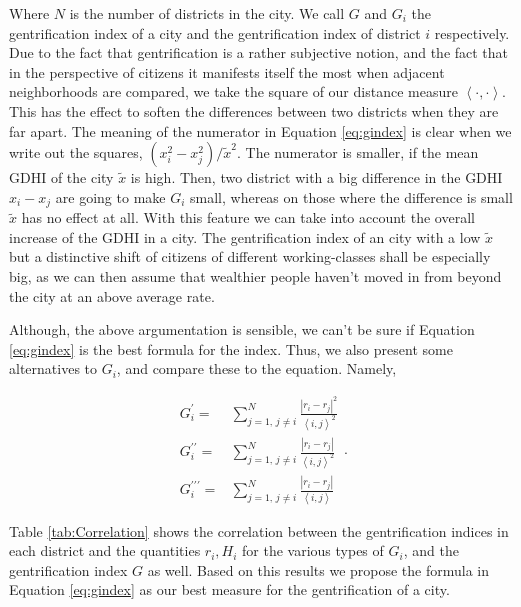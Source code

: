 \documentclass[a4paper, 10pt]{IEEEconf}      %
\begin{document}
Where $N$ is the number of districts in the city.
We call $G$ and $G_{i}$ the gentrification index of a city and the gentrification index of district $i$ respectively.
Due to the fact that gentrification is a rather subjective notion, and the fact that in the perspective of citizens it manifests 
itself the most when adjacent neighborhoods are compared, we take the square of our distance measure $\left\langle \cdot,\cdot\right\rangle $.
This has the effect to soften the differences between two districts when they are far apart. The meaning of the numerator in Equation \ref{eq:gindex}
is clear when we write out the squares, $\left(x_{i}^{2}-x_{j}^{2}\right)/\tilde{x}^{2}.$ The numerator is smaller, 
if the mean GDHI of the city $\tilde{x}$ is high. Then, two district with a big difference in the GDHI $x_{i}-x_{j}$ are going 
to make $G_{i}$ small, whereas on those where the difference is small $\tilde{x}$ has no effect at all. With this feature we can 
take into account the overall increase of the GDHI in a city. The gentrification index of an city with a low $\tilde{x}$ but a distinctive 
shift of citizens of different working-classes shall be especially big, as we can then assume that wealthier people haven't moved in from 
beyond the city at an above average rate.

Although, the above argumentation is sensible, we can't be sure if Equation \ref{eq:gindex} is the best formula for the index. Thus, we also present
some alternatives to $G_{i}$, and compare these to the equation. Namely, 

\begin{equation}
\begin{array}{cc}
G_{i}^{\prime}= & \sum_{j=1,\,j\neq i}^{N}\frac{\left|r_{i}-r_{j}\right|^{2}}{\left\langle i,j\right\rangle ^{2}}\\
G_{i}^{\prime\prime}= & \sum_{j=1,\,j\neq i}^{N}\frac{\left|r_{i}-r_{j}\right|}{\left\langle i,j\right\rangle ^{2}}\\
G_{i}^{\prime\prime\prime}= & \sum_{j=1,\,j\neq i}^{N}\frac{\left|r_{i}-r_{j}\right|}{\left\langle i,j\right\rangle }
\end{array}.
\label{eq:gindex_alt}
\end{equation}

Table \ref{tab:Correlation} shows the correlation between the gentrification indices in each district and the quantities $r_{i},H_{i}$ 
for the various types of $G_{i}$, and the gentrification index $G$ as well. Based on this results we propose the formula in Equation \ref{eq:gindex}
as our best measure for the gentrification of a city.
\end{document}
